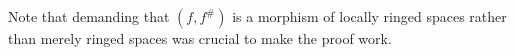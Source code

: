 Note that demanding that $(f, f^\#)$ is a morphism of locally ringed spaces rather
than merely ringed spaces was crucial to make the proof work.
